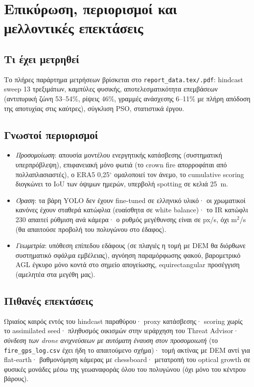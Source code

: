 \documentclass[11pt]{article}
\newcommand{\code}[1]{\texttt{#1}}
\begin{document}
\section{Επικύρωση, περιορισμοί και μελλοντικές επεκτάσεις}\label{sec:limits}

\subsection{Τι έχει μετρηθεί}
Το πλήρες παράρτημα μετρήσεων βρίσκεται στο \code{report\_data.tex/.pdf}:
hindcast sweep 13 τρεξιμάτων, καμπύλες φυσικής, αποτελεσματικότητα
επεμβάσεων (αντιπυρική ζώνη 53--54\%, ρίψεις 46\%, γραμμές ανάσχεσης
6--11\% με πλήρη απόδοση της αποτυχίας στις καύτρες), σύγκλιση PSO,
στατιστικά έργου.

\subsection{Γνωστοί περιορισμοί}
\begin{itemize}
  \item \emph{Προσομοίωση}: απουσία μοντέλου ενεργητικής κατάσβεσης
        (συστηματική υπερπρόβλεψη), επιφανειακή μόνο φωτιά (το crown fire
        απορροφάται από πολλαπλασιαστές), ο ERA5 0{,}25$^\circ$
        ομαλοποιεί τον άνεμο, το cumulative scoring διογκώνει το IoU των
        όψιμων ημερών, υπερβολή spotting σε κελιά 25~m.
  \item \emph{Όραση}: τα βάρη YOLO δεν έχουν fine-tuned σε ελληνικό
        υλικό· οι χρωματικοί κανόνες έχουν σταθερά κατώφλια (ευαίσθητα σε
        white balance)· το IR κατώφλι 230 απαιτεί ρύθμιση ανά κάμερα· ο
        ρυθμός μεγέθυνσης είναι σε px/s, όχι m$^2$/s (θα απαιτούσε
        προβολή του πολυγώνου στο έδαφος).
  \item \emph{Γεωμετρία}: υπόθεση επίπεδου εδάφους (σε πλαγιές η τομή με
        DEM θα διόρθωνε συστηματικό σφάλμα εμβέλειας), αγνόηση
        παραμόρφωσης φακού, βαρομετρικό AGL έγκυρο μόνο κοντά στο σημείο
        απογείωσης, equirectangular προσέγγιση (αμελητέα στα μεγέθη μας).
\end{itemize}

\subsection{Πιθανές επεκτάσεις}
Ωριαίος καιρός εντός του hindcast παραθύρου· proxy κατάσβεσης· scoring
χωρίς το assimilated seed· πληθυσμός οικισμών στην ιεράρχηση του Threat
Advisor· \emph{σύνδεση των drone ανιχνεύσεων με αυτόματη έναυση στον
προσομοιωτή} (το \code{fire\_gps\_log.csv} έχει ήδη το απαιτούμενο
σχήμα)· τομή ακτίνας με DEM αντί για flat-earth· βαθμονόμηση κάμερας με
chessboard· μετατροπή του optical growth σε φυσικές μονάδες μέσω της
γεωαναφοράς όλου του πολυγώνου (όχι μόνο του κέντρου βάρους).
\end{document}
